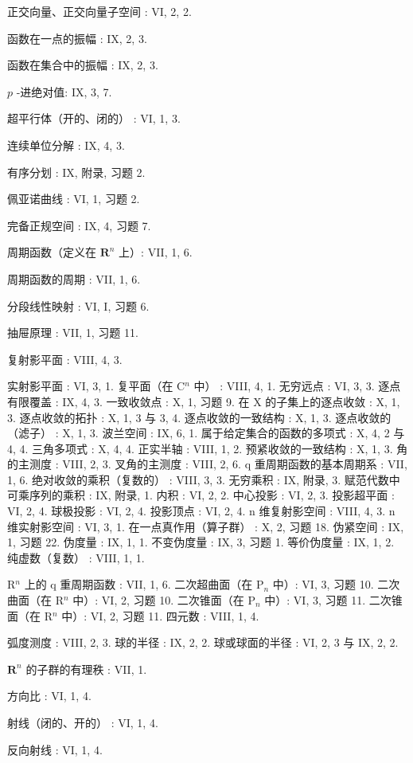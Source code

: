 正交向量、正交向量子空间 : VI, 2, 2.

函数在一点的振幅 : IX, 2, 3.

函数在集合中的振幅 : IX, 2, 3.

\(p\) -进绝对值: IX, 3, 7.

超平行体（开的、闭的） : VI, 1, 3.

连续单位分解 : IX, 4, 3.

有序分划 : IX, 附录, 习题 2.

佩亚诺曲线 : VI, 1, 习题 2.

完备正规空间 : IX, 4, 习题 7.

周期函数（定义在 \(\mathbf{R}^n\) 上）: VII, 1, 6.

周期函数的周期 : VII, 1, 6.

分段线性映射 : VI, I, 习题 6.

抽屉原理 : VII, 1, 习题 11.

复射影平面 : VIII, 4, 3.

实射影平面 : VI, 3, 1. 复平面（在 C\(^{n}\) 中） : VIII, 4, 1. 无穷远点 : VI, 3, 3. 逐点有限覆盖 : IX, 4, 3. 一致收敛点 : X, 1, 习题 9. 在 X 的子集上的逐点收敛 : X, 1, 3. 逐点收敛的拓扑 : X, 1, 3 与 3, 4. 逐点收敛的一致结构 : X, 1, 3. 逐点收敛的（滤子） : X, 1, 3. 波兰空间 : IX, 6, 1. 属于给定集合的函数的多项式 : X, 4, 2 与 4, 4. 三角多项式 : X, 4, 4. 正实半轴 : VIII, 1, 2. 预紧收敛的一致结构 : X, 1, 3. 角的主测度 : VIII, 2, 3. 叉角的主测度 : VIII, 2, 6. q 重周期函数的基本周期系 : VII, 1, 6. 绝对收敛的乘积（复数的） : VIII, 3, 3. 无穷乘积 : IX, 附录, 3. 赋范代数中可乘序列的乘积 : IX, 附录, 1. 内积 : VI, 2, 2. 中心投影 : VI, 2, 3. 投影超平面 : VI, 2, 4. 球极投影 : VI, 2, 4. 投影顶点 : VI, 2, 4. n 维复射影空间 : VIII, 4, 3. n 维实射影空间 : VI, 3, 1. 在一点真作用（算子群） : X, 2, 习题 18. 伪紧空间 : IX, 1, 习题 22. 伪度量 : IX, 1, 1. 不变伪度量 : IX, 3, 习题 1. 等价伪度量 : IX, 1, 2. 纯虚数（复数） : VIII, 1, 1.

R\(^{n}\) 上的 q 重周期函数 : VII, 1, 6. 二次超曲面（在 P\(_{n}\) 中）: VI, 3, 习题 10. 二次曲面（在 R\(^{n}\) 中）: VI, 2, 习题 10. 二次锥面（在 P\(_{n}\) 中）: VI, 3, 习题 11. 二次锥面（在 R\(^{n}\) 中）: VI, 2, 习题 11. 四元数 : VIII, 1, 4.

弧度测度 : VIII, 2, 3. 球的半径 : IX, 2, 2. 球或球面的半径 : VI, 2, 3 与 IX, 2, 2.

\(\mathbf{R}^n\) 的子群的有理秩 : VII, 1.

方向比 : VI, 1, 4.

射线（闭的、开的） : VI, 1, 4.

反向射线 : VI, 1, 4.

